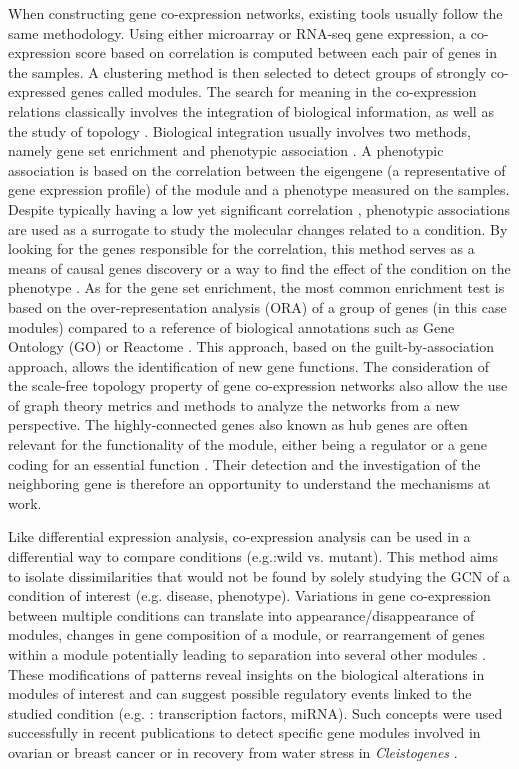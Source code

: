 When constructing gene co-expression networks, existing tools usually follow the same methodology. Using either microarray or RNA-seq gene expression, a co-expression score based on correlation is computed between each pair of genes in the samples. A clustering method is then selected to detect groups of strongly co-expressed genes called modules. The search for meaning in the co-expression relations classically involves the integration of biological information, as well as the study of topology . Biological integration usually involves two methods, namely gene set enrichment and phenotypic association . A phenotypic association is based on the correlation between the eigengene (a representative of gene expression profile) of the module and a phenotype measured on the samples. Despite typically having a low yet significant correlation , phenotypic associations are used as a surrogate to study the molecular changes related to a condition. By looking for the genes responsible for the correlation, this method serves as a means of causal genes discovery or a way to find the effect of the condition on the phenotype . As for the gene set enrichment, the most common enrichment test is based on the over-representation analysis (ORA) of a group of genes (in this case modules) compared to a reference of biological annotations such as Gene Ontology (GO)  or Reactome . This approach, based on the guilt-by-association approach, allows the identification of new gene functions. The consideration of the scale-free topology property of gene co-expression networks also allow the use of graph theory metrics and methods to analyze the networks from a new perspective.
The highly-connected genes also known as hub genes are often relevant for the functionality of the module, either being a regulator  or a gene coding for an essential function . Their detection and the investigation of the neighboring gene is therefore an opportunity to understand the mechanisms at work.

Like differential expression analysis, co-expression analysis can be used in a differential way to compare conditions (e.g.:wild vs. mutant). This method aims to isolate dissimilarities  that would not be found by solely studying the GCN of a condition of interest (e.g. disease, phenotype). Variations in gene co-expression between multiple conditions can translate into appearance/disappearance of modules, changes in gene composition of a module, or rearrangement of genes within a module potentially leading to separation into several other modules . These modifications of patterns reveal insights on the biological alterations in modules of interest and can suggest possible regulatory events linked to the studied condition (e.g. : transcription factors, miRNA). Such concepts were used successfully in recent publications to  detect specific gene modules involved in ovarian or breast cancer  or in recovery from water stress in \textit{Cleistogenes} .

